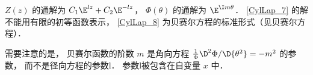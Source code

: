 $Z\left( z \right)$ 的通解为 ${C_1}{\E^{lz}} + {C_2}{\E^{ - lz}}$，   $\Phi \left( \theta  \right)$ 的通解为 ${\E^{\I m\theta }}$．   \autoref{CylLap_7} 的解不能用有限的初等函数表示， \autoref{CylLap_8} 为贝赛尔方程的标准形式（见贝赛尔方程）．

需要注意的是， 贝赛尔函数的阶数 $m$ 是角向方程 $\frac{1}{\Phi }{{{\D^2}\Phi }}/{{\D{\theta ^2}}} =  - {m^2}$ 的参数， 而不是径向方程的参数l． 参数l被包含在自变量 $x$ 中．
 
